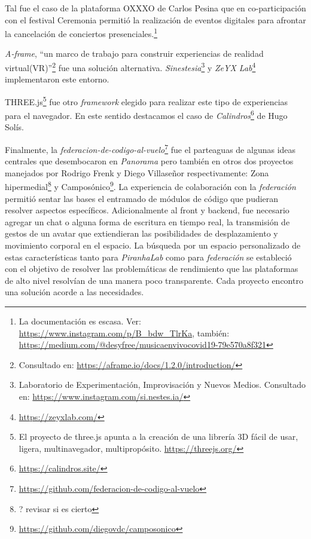 Tal fue el caso de la plataforma OXXXO de Carlos Pesina que en co-participación con el festival Ceremonia permitió la realización de eventos digitales para afrontar la cancelación de conciertos presenciales.\footnote{La documentación es escasa. Ver: \url{https://www.instagram.com/p/B_bdw_TlrKa}, también: \url{https://medium.com/@desyfree/musicaenvivocovid19-79e570a8f321}}

\textit{A-frame}, ``un marco de trabajo para construir experiencias de realidad virtual(VR)''\footnote{Consultado en: \url{https://aframe.io/docs/1.2.0/introduction/}} fue una solución alternativa. \textit{Sinestesia}\footnote{Laboratorio de Experimentación, Improvisación y Nuevos Medios. Consultado en: \url{https://www.instagram.com/si.nestes.ia/}} y \textit{ZeYX Lab}\footnote{\url{https://zeyxlab.com/}} implementaron este entorno. %

THREE.js\footnote{El proyecto de three.js apunta a la creación de una librería 3D fácil de usar, ligera, multinavegador, multipropósito. \url{https://threejs.org/}} fue otro \textit{framework} elegido para realizar este tipo de experiencias para el navegador. En este sentido destacamos el caso de \textit{Calindros}\footnote{\url{https://calindros.site/}} de Hugo Solís. %

Finalmente, la \textit{federacion-de-codigo-al-vuelo}\footnote{\url{https://github.com/federacion-de-codigo-al-vuelo}} fue el parteaguas de algunas ideas centrales que desembocaron en \textit{Panorama} pero también en otros dos proyectos manejados por Rodrigo Frenk y Diego Villaseñor respectivamente: Zona hipermedial\footnote{? revisar si es cierto} y Camposónico\footnote{\url{https://github.com/diegovdc/camposonico}}. La experiencia de colaboración con la \textit{federación} permitió sentar las bases el entramado de módulos de código que pudieran resolver aspectos específicos. Adicionalmente al front y backend, fue necesario agregar un chat o alguna forma de escritura en tiempo real, la transmisión de gestos de un avatar que extiendieran las posibilidades de desplazamiento y movimiento corporal en el espacio. La búsqueda por un espacio personalizado de estas características tanto para \textit{PiranhaLab} como para \textit{federación} se estableció con el objetivo de resolver las problemáticas de rendimiento que las plataformas de alto nivel resolvían de una manera poco transparente. Cada proyecto encontro una solución acorde a las necesidades. 

